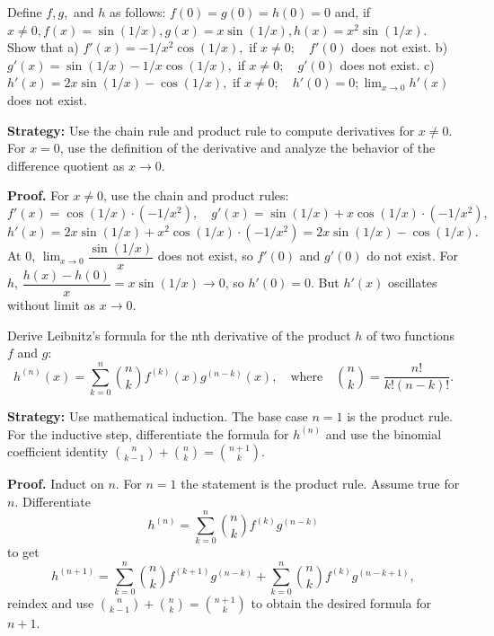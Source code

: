 \begin{problembox}
Define \( f, g, \) and \( h \) as follows: \( f(0) = g(0) = h(0) = 0 \) and, if \( x \neq 0, f(x) = \sin (1/x), g(x) = x \sin (1/x), h(x) = x^2 \sin (1/x) \). Show that
a) \( f'(x) = -1/x^2 \cos (1/x), \) if \( x \neq 0; \quad f'(0) \) does not exist.
b) \( g'(x) = \sin (1/x) - 1/x \cos (1/x), \) if \( x \neq 0; \quad g'(0) \) does not exist.
c) \( h'(x) = 2x \sin (1/x) - \cos (1/x), \) if \( x \neq 0; \quad h'(0) = 0; \lim_{x \to 0} h'(x) \) does not exist.
\end{problembox}

\noindent\textbf{Strategy:} Use the chain rule and product rule to compute derivatives for \( x \neq 0 \). For \( x = 0 \), use the definition of the derivative and analyze the behavior of the difference quotient as \( x \to 0 \).

\noindent\textbf{Proof.}
For $x\ne 0$, use the chain and product rules:
\[f'(x)=\cos(1/x)\cdot(-1/x^2),\quad g'(x)=\sin(1/x)+x\cos(1/x)\cdot(-1/x^2),\]
\[h'(x)=2x\sin(1/x)+x^2\cos(1/x)\cdot(-1/x^2)=2x\sin(1/x)-\cos(1/x).\]
At $0$, $\lim_{x\to 0}\dfrac{\sin(1/x)}{x}$ does not exist, so $f'(0)$ and $g'(0)$ do not exist. For $h$, $\dfrac{h(x)-h(0)}{x}=x\sin(1/x)\to 0$, so $h'(0)=0$. But $h'(x)$ oscillates without limit as $x\to 0$.



\begin{problembox}
Derive Leibnitz's formula for the nth derivative of the product \( h \) of two functions \( f \) and \( g \):
\[ h^{(n)}(x) = \sum_{k=0}^{n} \binom{n}{k} f^{(k)}(x)g^{(n-k)}(x), \quad \text{where} \quad \binom{n}{k} = \frac{n!}{k!(n-k)!}. \]
\end{problembox}

\noindent\textbf{Strategy:} Use mathematical induction. The base case \( n = 1 \) is the product rule. For the inductive step, differentiate the formula for \( h^{(n)} \) and use the binomial coefficient identity \( \binom{n}{k-1} + \binom{n}{k} = \binom{n+1}{k} \).

\noindent\textbf{Proof.}
Induct on $n$. For $n=1$ the statement is the product rule. Assume true for $n$. Differentiate
\[h^{(n)}=\sum_{k=0}^n\binom{n}{k}f^{(k)}g^{(n-k)}\]
to get
\[h^{(n+1)}=\sum_{k=0}^n\binom{n}{k}f^{(k+1)}g^{(n-k)}+\sum_{k=0}^n\binom{n}{k}f^{(k)}g^{(n-k+1)},\]
reindex and use $\binom{n}{k-1}+\binom{n}{k}=\binom{n+1}{k}$ to obtain the desired formula for $n+1$.



